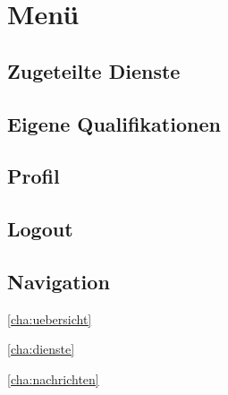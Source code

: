 \chapter{Menü}
\label{cha:menu}

\section{Zugeteilte Dienste}
\label{sec:menu_approvedservice}

\section{Eigene Qualifikationen}
\label{sec:menu_qualification}

\section{Profil}
\label{sec:menu_profile}

\section{Logout}
\label{sec:menu_logout}

\section{Navigation}
\label{sec:menu_navigation}

\ref{cha:uebersicht} 

\ref{cha:dienste} 

\ref{cha:nachrichten} 